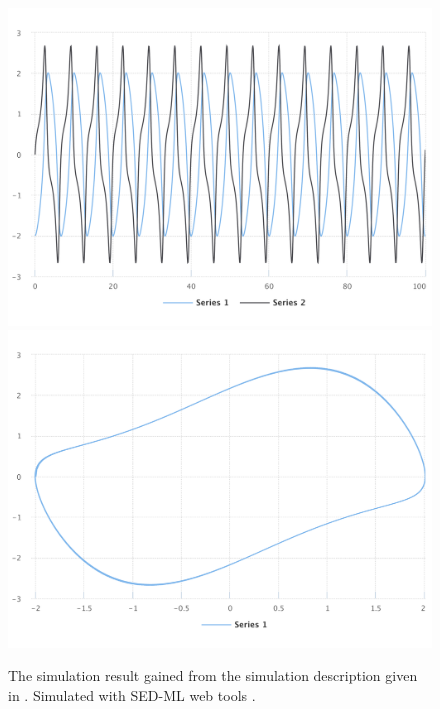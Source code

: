 \begin{figure}[ht]
    \centering
    \begin{minipage}{0.47\textwidth}
        \centering
        \includegraphics[width=1.0\textwidth]{examples/vanderpol-sbml/results/sedml_webtools/plot1}
        \includegraphics[width=1.0\textwidth]{examples/vanderpol-sbml/results/sedml_webtools/plot2}
        \caption{The simulation result gained from the simulation description given in . Simulated with SED-ML web tools \citep{bergmann2017sed}.}
    \end{minipage}\hfill
    \begin{minipage}{0.47\textwidth}
        \centering

\end{minipage}
\end{figure}
